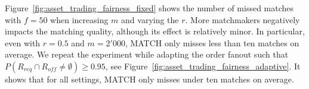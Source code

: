 Figure~\ref{fig:asset_trading_fairness_fixed} shows the number of missed matches with $ f = 50 $ when increasing $ m $ and varying the $ r $.
More matchmakers negatively impacts the matching quality, although its effect is relatively minor.
In particular, even with $ r = 0.5 $ and $ m = 2'000 $, MATCH only misses less than ten matches on average.
We repeat the experiment while adapting the order fanout such that $ P(R_{req} \cap R_{off} \neq \emptyset) \geq 0.95 $, see Figure~\ref{fig:asset_trading_fairness_adaptive}.
It shows that for all settings, MATCH only misses under ten matches on average.




